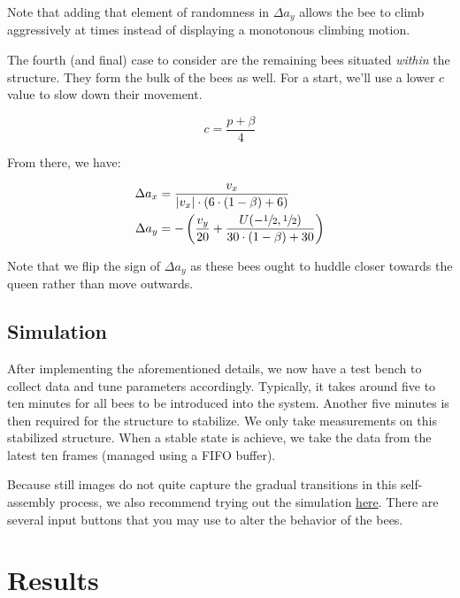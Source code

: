 \documentclass[a4paper,10pt]{article}
\begin{document}
\begin{multicols}{2}
    Note that adding that element of randomness in $\Delta a_{y}$ allows the bee
    to climb aggressively at times instead of displaying a monotonous climbing motion.

    The fourth (and final) case to consider are the remaining bees situated \textit{within}
    the structure. They form the bulk of the bees as well. For a start, we'll use a lower
    $c$ value to slow down their movement.

    \begin{equation}
        c = \frac{p + \beta}{4}
    \end{equation}

    From there, we have:

    \begin{equation}
        \begin{split}
            \Delta a_{x} &= \frac{v_{x}}{|v_{x}| \cdot (6 \cdot  (1-\beta) + 6)} \\
            \Delta a_{y} &= -\left(\frac{v_{y}}{20} + \frac{U(-\sfrac{1}{2}, \sfrac{1}{2})}{30 \cdot (1-\beta) + 30}\right)
        \end{split}
    \end{equation}

    Note that we flip the sign of $\Delta a_{y}$ as these bees ought to huddle closer towards
    the queen rather than move outwards.

    \subsection{Simulation}

    After implementing the aforementioned details, we now have a test bench to collect
    data and tune parameters accordingly. Typically, it takes around five to ten minutes
    for all bees to be introduced into the system. Another five minutes is then required
    for the structure to stabilize. We only take measurements on this stabilized structure.
    When a stable state is achieve, we take the data from the latest ten frames (managed using a FIFO buffer).

    Because still images do not quite capture the gradual transitions in this self-assembly
    process, we also recommend trying out the simulation \href{https://anacc22.github.io/URECA_Bee_Simulation/}{here}.
    There are several input buttons that you may use to alter the behavior of the bees.

    \section{Results}


\end{multicols}
\end{document}
